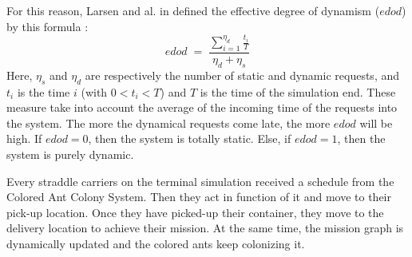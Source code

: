 \documentclass[a4paper,10pt]{article}
\makeatletter
\newenvironment{figurehere}
{\def\@captype{figure}}
{}
\makeatother
\begin{document}
\begin{multicols}{2}
For this reason, Larsen and al. in \cite{larsen00} defined the effective degree of dynamism ($edod$) by this formula : \\
\begin{equation}
	edod\;=\; \frac{\sum_{i=1}^{\eta_d}\frac{t_i}{T}}{\eta_d+\eta_s}
\end{equation}
Here, $\eta_s$ and $\eta_d$ are respectively the number of static and dynamic requests, and $t_i$ is the time $i$ (with $0 < t_i < T $) and $T$ is the time of the simulation end. These measure take into account the average of the incoming time of the requests into the system. The more the dynamical requests come late, the more $edod$ will be high. If $edod=0$, then the system is totally static. Else, if $edod = 1$, then the system is purely dynamic.


Every straddle carriers on the terminal simulation received a schedule from the Colored Ant Colony System. Then they act in function of it and move to their pick-up location. Once they have picked-up their container, they move to the delivery location to achieve their mission. At the same time, the mission graph is dynamically updated and the colored ants keep colonizing it.\\

\begin{figurehere}
\label{tview}
\end{figurehere}


\end{multicols}
\end{document}
